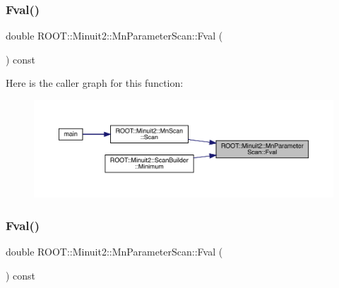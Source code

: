 \subsubsection{\texorpdfstring{Fval()}{Fval()}\hspace{0.1cm}{\footnotesize\ttfamily [1/3]}}
{\footnotesize\ttfamily double R\+O\+O\+T\+::\+Minuit2\+::\+Mn\+Parameter\+Scan\+::\+Fval (\begin{DoxyParamCaption}{ }\end{DoxyParamCaption}) const\hspace{0.3cm}{\ttfamily [inline]}}

Here is the caller graph for this function\+:
\nopagebreak
\begin{figure}[H]
\begin{center}
\leavevmode
\includegraphics[width=350pt]{da/d9e/classROOT_1_1Minuit2_1_1MnParameterScan_a7251577562ac12179ea9669e9a10bac7_icgraph}
\end{center}
\end{figure}
\mbox{\label{classROOT_1_1Minuit2_1_1MnParameterScan_a7251577562ac12179ea9669e9a10bac7}} 
\subsubsection{\texorpdfstring{Fval()}{Fval()}\hspace{0.1cm}{\footnotesize\ttfamily [2/3]}}
{\footnotesize\ttfamily double R\+O\+O\+T\+::\+Minuit2\+::\+Mn\+Parameter\+Scan\+::\+Fval (\begin{DoxyParamCaption}{ }\end{DoxyParamCaption}) const\hspace{0.3cm}{\ttfamily [inline]}}

\mbox{\label{classROOT_1_1Minuit2_1_1MnParameterScan_a7251577562ac12179ea9669e9a10bac7}} 
